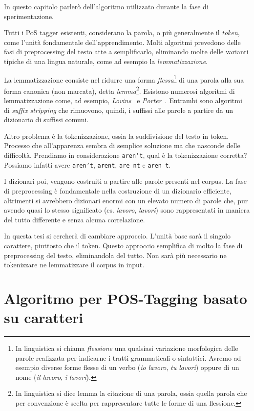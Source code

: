 In questo capitolo parler\`o dell'algoritmo utilizzato durante la fase di sperimentazione.

Tutti i PoS tagger esistenti, considerano la parola, o pi\`u generalmente il
\emph{token}, come l'unit\`a fondamentale dell'apprendimento. Molti algoritmi
prevedono delle fasi di preprocessing del testo atte a semplificarlo, eliminando
molte delle varianti tipiche di una lingua naturale, come ad esempio la \emph{lemmatizzazione}.

La lemmatizzazione consiste nel ridurre una forma \emph{flessa}\footnote{In
linguistica si chiama \emph{flessione} una qualsiasi variazione morfologica delle
parole realizzata per indicarne i tratti grammaticali o sintattici. Avremo ad
esempio diverse forme flesse di un verbo (\emph{io lavoro}, \emph{tu lavori})
oppure di un nome (\emph{il lavoro}, \emph{i lavori}).} di una parola alla sua
forma canonica (non marcata), detta \emph{lemma}\footnote{In linguistica si dice
lemma la citazione di una parola, ossia quella parola che per convenzione è scelta
per rappresentare tutte le forme di una flessione.}. Esistono numerosi algoritmi
di lemmatizzazione come, ad esempio, \emph{Lovins}~\cite{Lovins:1968} e
\emph{Porter}~\cite{Porter:1980}. Entrambi sono algoritmi di \emph{suffix stripping}
che rimuovono, quindi, i suffissi alle parole a partire da un dizionario di suffissi
comuni.

Altro problema \`e la tokenizzazione, ossia la suddivisione del testo in token.
Processo che all'apparenza sembra di semplice soluzione ma che nasconde delle
difficolt\`a. Prendiamo in considerazione \texttt{aren't}, qual \`e la tokenizzazione
corretta? Possiamo infatti avere \texttt{aren't}, \texttt{arent}, \texttt{are nt}
e \texttt{aren t}.

I dizionari poi, vengono costruiti a partire alle parole presenti nel corpus.
La fase di preprocessing \`e fondamentale nella costruzione di un dizionario
efficiente, altrimenti si avrebbero dizionari enormi con un elevato numero di
parole che, pur avendo quasi lo stesso significato (es. \emph{lavoro}, \emph{lavori})
sono rappresentati in maniera del tutto differente e senza alcuna correlazione.

In questa tesi si cercher\`a di cambiare approccio. L'unit\`a base sar\`a il
singolo carattere, piuttosto che il token. Questo approccio semplifica di molto
la fase di preprocessing del testo, eliminandola del tutto. Non sar\`a pi\`u
necessario ne tokenizzare ne lemmatizzare il corpus in input.

\section{Algoritmo per POS-Tagging basato su caratteri}

